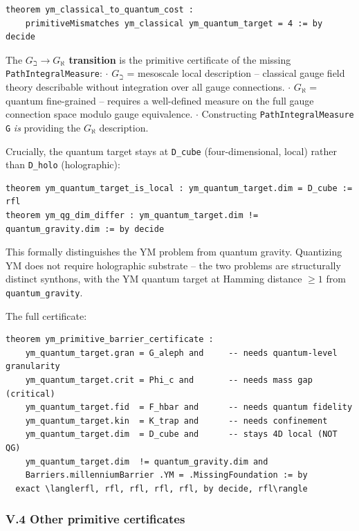 \documentclass[12pt,a4paper]{article}
\begin{document}
\begin{lstlisting}[language=lean]
theorem ym_classical_to_quantum_cost :
    primitiveMismatches ym_classical ym_quantum_target = 4 := by decide
\end{lstlisting}

The \textbf{$G_{\beth} \to G_{\aleph}$ transition} is the primitive certificate of the missing \texttt{PathIntegralMeasure}:
$\cdot$ $G_{\beth}$ = mesoscale local description  --  classical gauge field theory describable without integration over all gauge connections.
$\cdot$ $G_{\aleph}$ = quantum fine-grained  --  requires a well-defined measure on the full gauge connection space modulo gauge equivalence.
$\cdot$ Constructing \texttt{PathIntegralMeasure G} \emph{is} providing the $G_{\aleph}$ description.

Crucially, the quantum target stays at \texttt{D\_cube} (four-dimensional, local) rather than \texttt{D\_holo} (holographic):

\begin{lstlisting}[language=lean]
theorem ym_quantum_target_is_local : ym_quantum_target.dim = D_cube := rfl
theorem ym_qg_dim_differ : ym_quantum_target.dim != quantum_gravity.dim := by decide
\end{lstlisting}

This formally distinguishes the YM problem from quantum gravity. Quantizing YM does not require holographic substrate  --  the two problems are structurally distinct synthons, with the YM quantum target at Hamming distance $\geq 1$ from \texttt{quantum\_gravity}.

The full certificate:

\begin{lstlisting}[language=lean]
theorem ym_primitive_barrier_certificate :
    ym_quantum_target.gran = G_aleph and     -- needs quantum-level granularity
    ym_quantum_target.crit = Phi_c and       -- needs mass gap (critical)
    ym_quantum_target.fid  = F_hbar and      -- needs quantum fidelity
    ym_quantum_target.kin  = K_trap and      -- needs confinement
    ym_quantum_target.dim  = D_cube and      -- stays 4D local (NOT QG)
    ym_quantum_target.dim  != quantum_gravity.dim and
    Barriers.millenniumBarrier .YM = .MissingFoundation := by
  exact \langlerfl, rfl, rfl, rfl, rfl, by decide, rfl\rangle
\end{lstlisting}

\subsubsection{V.4 Other primitive certificates}
\end{document}
